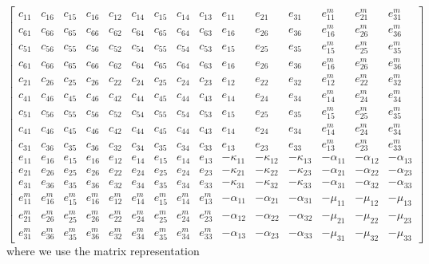\documentclass[a4paper,twoside,11pt]{book}
\begin{document}
\begin{equation}
  \left[\begin{array}{ccccccccc|ccc|ccc}
c_{11}  &c_{16}  &c_{15}  &c_{16}  &c_{12}  &c_{14}  &c_{15}  &c_{14}  &c_{13}  &e_{11}  &e_{21}  &e_{31}  &e^m_{11}  &e^m_{21}  &e^m_{31}  \\
c_{61}  &c_{66}  &c_{65}  &c_{66}  &c_{62}  &c_{64}  &c_{65}  &c_{64}  &c_{63}  &e_{16}  &e_{26}  &e_{36}  &e^m_{16}  &e^m_{26}  &e^m_{36}  \\
c_{51}  &c_{56}  &c_{55}  &c_{56}  &c_{52}  &c_{54}  &c_{55}  &c_{54}  &c_{53}  &e_{15}  &e_{25}  &e_{35}  &e^m_{15}  &e^m_{25}  &e^m_{35}  \\
c_{61}  &c_{66}  &c_{65}  &c_{66}  &c_{62}  &c_{64}  &c_{65}  &c_{64}  &c_{63}  &e_{16}  &e_{26}  &e_{36}  &e^m_{16}  &e^m_{26}  &e^m_{36}  \\
c_{21}  &c_{26}  &c_{25}  &c_{26}  &c_{22}  &c_{24}  &c_{25}  &c_{24}  &c_{23}  &e_{12}  &e_{22}  &e_{32}  &e^m_{12}  &e^m_{22}  &e^m_{32}  \\
c_{41}  &c_{46}  &c_{45}  &c_{46}  &c_{42}  &c_{44}  &c_{45}  &c_{44}  &c_{43}  &e_{14}  &e_{24}  &e_{34}  &e^m_{14}  &e^m_{24}  &e^m_{34}  \\
c_{51}  &c_{56}  &c_{55}  &c_{56}  &c_{52}  &c_{54}  &c_{55}  &c_{54}  &c_{53}  &e_{15}  &e_{25}  &e_{35}  &e^m_{15}  &e^m_{25}  &e^m_{35}  \\
c_{41}  &c_{46}  &c_{45}  &c_{46}  &c_{42}  &c_{44}  &c_{45}  &c_{44}  &c_{43}  &e_{14}  &e_{24}  &e_{34}  &e^m_{14}  &e^m_{24}  &e^m_{34}  \\
c_{31}  &c_{36}  &c_{35}  &c_{36}  &c_{32}  &c_{34}  &c_{35}  &c_{34}  &c_{33}  &e_{13}  &e_{23}  &e_{33}  &e^m_{13}  &e^m_{23}  &e^m_{33}  \\ \hline
e_{11}  &e_{16}  &e_{15}  &e_{16}  &e_{12}  &e_{14}  &e_{15}  &e_{14}  &e_{13}  &-\kappa_{11} &-\kappa_{12} &-\kappa_{13} &-\alpha_{11} &-\alpha_{12} &-\alpha_{13} \\
e_{21}  &e_{26}  &e_{25}  &e_{26}  &e_{22}  &e_{24}  &e_{25}  &e_{24}  &e_{23}  &-\kappa_{21} &-\kappa_{22} &-\kappa_{23} &-\alpha_{21} &-\alpha_{22} &-\alpha_{23} \\
e_{31}  &e_{36}  &e_{35}  &e_{36}  &e_{32}  &e_{34}  &e_{35}  &e_{34}  &e_{33}  &-\kappa_{31} &-\kappa_{32} &-\kappa_{33} &-\alpha_{31} &-\alpha_{32} &-\alpha_{33} \\ \hline
e^m_{11}  &e^m_{16}  &e^m_{15}  &e^m_{16}  &e^m_{12}  &e^m_{14}  &e^m_{15}  &e^m_{14}  &e^m_{13}  &-\alpha_{11} &-\alpha_{21} &-\alpha_{31} &-\mu_{11} &-\mu_{12} &-\mu_{13} \\
e^m_{21}  &e^m_{26}  &e^m_{25}  &e^m_{26}  &e^m_{22}  &e^m_{24}  &e^m_{25}  &e^m_{24}  &e^m_{23}  &-\alpha_{12} &-\alpha_{22} &-\alpha_{32} &-\mu_{21} &-\mu_{22} &-\mu_{23} \\
e^m_{31}  &e^m_{36}  &e^m_{35}  &e^m_{36}  &e^m_{32}  &e^m_{34}  &e^m_{35}  &e^m_{34}  &e^m_{33}  &-\alpha_{13} &-\alpha_{23} &-\alpha_{33} &-\mu_{31} &-\mu_{32} &-\mu_{33} 
  \end{array}\right]
  \label{comC}
\end{equation}
where we use the matrix representation
\end{document}
